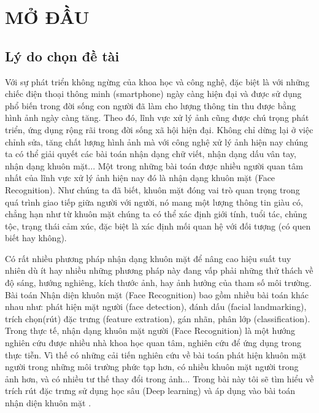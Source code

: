 

\chapter*{MỞ ĐẦU}
\label{part: dimred}

\section{Lý do chọn đề tài}

Với sự phát triển không ngừng của khoa học và công nghệ, đặc biệt là với những
chiếc điện thoại thông minh (smartphone) ngày càng hiện đại và được sử dụng
phổ biến trong đời sống con người đã làm cho lượng thông tin thu được bằng hình ảnh
ngày càng tăng. Theo đó, lĩnh vực xử lý ảnh cũng được chú trọng phát triển, ứng dụng
rộng rãi trong đời sống xã hội hiện đại. Không chỉ dừng lại ở việc chỉnh sửa, tăng
chất lượng hình ảnh mà với công nghệ xử lý ảnh hiện nay chúng ta có thể giải quyết
các bài toán nhận dạng chữ viết, nhận dạng dấu vân tay, nhận dạng khuôn mặt...
Một trong những bài toán được nhiều người quan tâm nhất của lĩnh vực xử lý ảnh hiện nay
đó là nhận dạng khuôn mặt (Face Recognition). Như chúng ta đã biết, khuôn mặt đóng
vai trò quan trọng trong quá trình giao tiếp giữa người với người, nó mang một lượng
thông tin giàu có, chẳng hạn như từ khuôn mặt chúng ta có thể xác định giới tính, tuổi tác,
chủng tộc, trạng thái cảm xúc, đặc biệt là xác định mối quan hệ với đối tượng (có quen biết
hay không).

Có rất nhiều phương pháp nhận dạng khuôn mặt để nâng cao hiệu suất tuy nhiên dù ít hay
nhiều những phương pháp này đang vấp phải những thử thách về độ sáng, hướng nghiêng,
kích thước ảnh, hay ảnh hưởng của tham số môi trường. Bài toán
Nhận diện khuôn mặt (Face Recognition) bao gồm nhiều bài toán khác nhau như:
phát hiện mặt người (face detection), đánh dấu (facial landmarking), trích chọn(rút) đặc trưng
(feature extration), gán nhãn, phân lớp (classification).
Trong thực tế, nhận dạng khuôn mặt người (Face Recognition) là một hướng nghiên cứu được
nhiều nhà khoa học quan tâm, nghiên cứu để ứng dụng trong thực tiễn.
Vì thế có những cải tiến nghiên cứu về bài toán phát hiện khuôn mặt người trong
những môi trường phức tạp hơn, có nhiều khuôn mặt người trong ảnh hơn,
và có nhiều tư thế thay đổi trong ảnh... Trong bài này tôi sẽ tìm hiểu về trích rút đặc
trưng sử dụng học sâu (Deep learning) và áp dụng vào bài toán nhận diện khuôn mặt .

